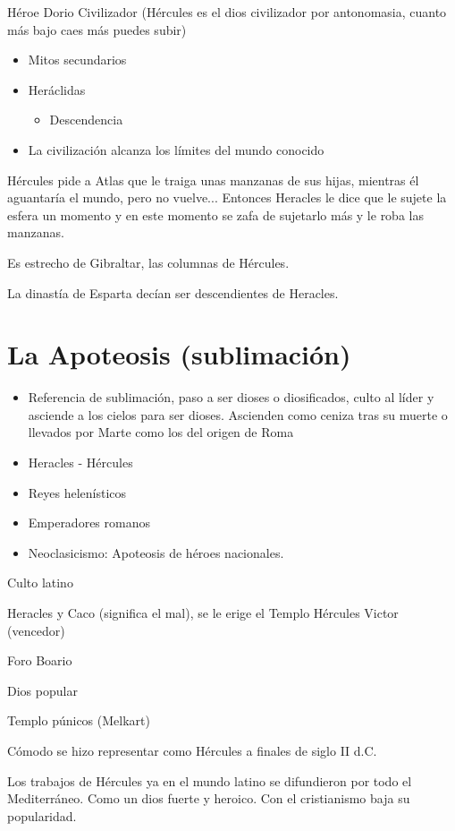 Héroe Dorio Civilizador (Hércules es el dios civilizador por antonomasia, cuanto más bajo caes más puedes subir)
\begin{itemize}
    \item Mitos secundarios
    \item Heráclidas
    \begin{itemize}
        \item Descendencia
    \end{itemize}
    \item La civilización alcanza  los límites del mundo conocido
\end{itemize}

Hércules pide a Atlas que le traiga unas manzanas de sus hijas, mientras él aguantaría el mundo, pero no vuelve... Entonces Heracles le dice que le sujete la esfera un momento y en este momento se zafa de sujetarlo más y le roba las manzanas. 

Es estrecho de Gibraltar, las columnas de Hércules.

La dinastía de Esparta decían ser descendientes de Heracles.

\section{La Apoteosis (sublimación)}
\begin{itemize}
    \item Referencia de sublimación, paso a ser dioses o diosificados, culto al líder y asciende a los cielos para ser dioses. Ascienden como ceniza tras su muerte o llevados por Marte como los del origen de Roma
    \item Heracles - Hércules
    \item Reyes helenísticos
    \item Emperadores romanos
    \item Neoclasicismo: Apoteosis de héroes nacionales.
\end{itemize}

Culto latino

Heracles y Caco (significa el mal), se le erige el Templo Hércules Victor (vencedor)

Foro Boario

Dios popular

Templo púnicos (Melkart)

Cómodo se hizo representar como Hércules a finales de siglo II d.C.

Los trabajos de Hércules ya en el mundo latino se difundieron por todo el Mediterráneo. Como un dios fuerte y heroico. Con el cristianismo baja su popularidad.

